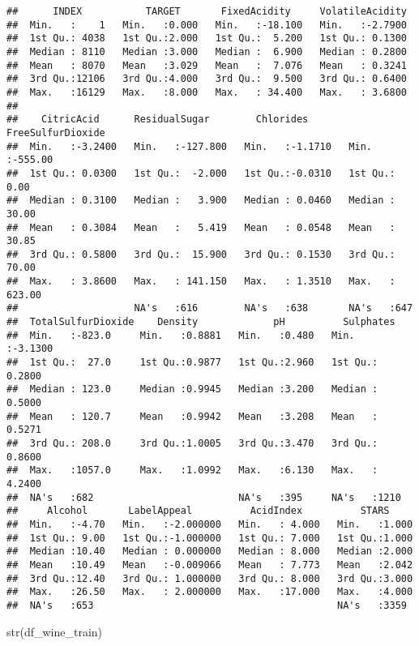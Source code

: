 \documentclass[
]{article}
\newenvironment{Shaded}{\begin{snugshade}}{\end{snugshade}}
\newcommand{\FunctionTok}[1]{\textcolor[rgb]{0.00,0.00,0.00}{#1}}
\newcommand{\NormalTok}[1]{#1}
\begin{document}
\begin{verbatim}
##      INDEX           TARGET       FixedAcidity     VolatileAcidity  
##  Min.   :    1   Min.   :0.000   Min.   :-18.100   Min.   :-2.7900  
##  1st Qu.: 4038   1st Qu.:2.000   1st Qu.:  5.200   1st Qu.: 0.1300  
##  Median : 8110   Median :3.000   Median :  6.900   Median : 0.2800  
##  Mean   : 8070   Mean   :3.029   Mean   :  7.076   Mean   : 0.3241  
##  3rd Qu.:12106   3rd Qu.:4.000   3rd Qu.:  9.500   3rd Qu.: 0.6400  
##  Max.   :16129   Max.   :8.000   Max.   : 34.400   Max.   : 3.6800  
##                                                                     
##    CitricAcid      ResidualSugar        Chlorides       FreeSulfurDioxide
##  Min.   :-3.2400   Min.   :-127.800   Min.   :-1.1710   Min.   :-555.00  
##  1st Qu.: 0.0300   1st Qu.:  -2.000   1st Qu.:-0.0310   1st Qu.:   0.00  
##  Median : 0.3100   Median :   3.900   Median : 0.0460   Median :  30.00  
##  Mean   : 0.3084   Mean   :   5.419   Mean   : 0.0548   Mean   :  30.85  
##  3rd Qu.: 0.5800   3rd Qu.:  15.900   3rd Qu.: 0.1530   3rd Qu.:  70.00  
##  Max.   : 3.8600   Max.   : 141.150   Max.   : 1.3510   Max.   : 623.00  
##                    NA's   :616        NA's   :638       NA's   :647      
##  TotalSulfurDioxide    Density             pH          Sulphates      
##  Min.   :-823.0     Min.   :0.8881   Min.   :0.480   Min.   :-3.1300  
##  1st Qu.:  27.0     1st Qu.:0.9877   1st Qu.:2.960   1st Qu.: 0.2800  
##  Median : 123.0     Median :0.9945   Median :3.200   Median : 0.5000  
##  Mean   : 120.7     Mean   :0.9942   Mean   :3.208   Mean   : 0.5271  
##  3rd Qu.: 208.0     3rd Qu.:1.0005   3rd Qu.:3.470   3rd Qu.: 0.8600  
##  Max.   :1057.0     Max.   :1.0992   Max.   :6.130   Max.   : 4.2400  
##  NA's   :682                         NA's   :395     NA's   :1210     
##     Alcohol       LabelAppeal          AcidIndex          STARS      
##  Min.   :-4.70   Min.   :-2.000000   Min.   : 4.000   Min.   :1.000  
##  1st Qu.: 9.00   1st Qu.:-1.000000   1st Qu.: 7.000   1st Qu.:1.000  
##  Median :10.40   Median : 0.000000   Median : 8.000   Median :2.000  
##  Mean   :10.49   Mean   :-0.009066   Mean   : 7.773   Mean   :2.042  
##  3rd Qu.:12.40   3rd Qu.: 1.000000   3rd Qu.: 8.000   3rd Qu.:3.000  
##  Max.   :26.50   Max.   : 2.000000   Max.   :17.000   Max.   :4.000  
##  NA's   :653                                          NA's   :3359
\end{verbatim}

\begin{Shaded}
\begin{Highlighting}[]
\FunctionTok{str}\NormalTok{(df\_wine\_train)}
\end{Highlighting}
\end{Shaded}
\end{document}
